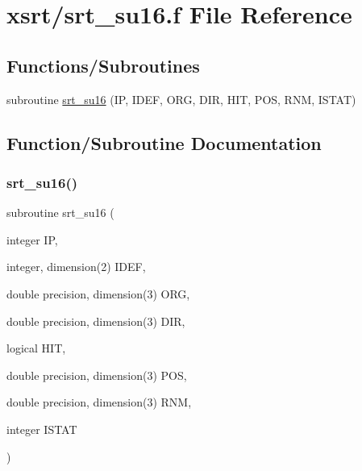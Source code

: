 \hypertarget{srt__su16_8f}{}\section{xsrt/srt\+\_\+su16.f File Reference}
\label{srt__su16_8f}
\subsection*{Functions/\+Subroutines}
\begin{DoxyCompactItemize}
\item 
subroutine \hyperlink{srt__su16_8f_a4eed96ff4faf18f27b2cc7d657bdc680}{srt\+\_\+su16} (IP, I\+D\+EF, O\+RG, D\+IR, H\+IT, P\+OS, R\+NM, I\+S\+T\+AT)
\end{DoxyCompactItemize}


\subsection{Function/\+Subroutine Documentation}
\mbox{\label{srt__su16_8f_a4eed96ff4faf18f27b2cc7d657bdc680}} 
\subsubsection{\texorpdfstring{srt\+\_\+su16()}{srt\_su16()}}
{\footnotesize\ttfamily subroutine srt\+\_\+su16 (\begin{DoxyParamCaption}\item[{integer}]{IP,  }\item[{integer, dimension(2)}]{I\+D\+EF,  }\item[{double precision, dimension(3)}]{O\+RG,  }\item[{double precision, dimension(3)}]{D\+IR,  }\item[{logical}]{H\+IT,  }\item[{double precision, dimension(3)}]{P\+OS,  }\item[{double precision, dimension(3)}]{R\+NM,  }\item[{integer}]{I\+S\+T\+AT }\end{DoxyParamCaption})}

